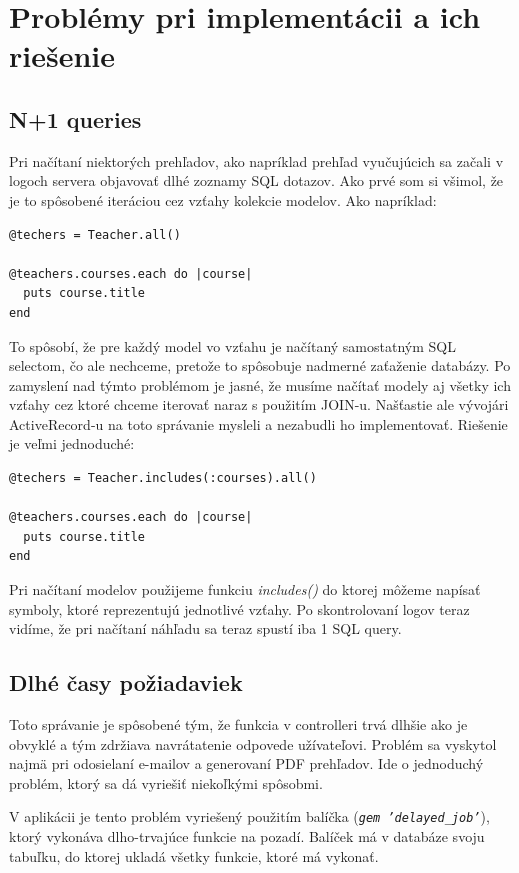 \section{Problémy pri implementácii a ich riešenie}
\subsection{N+1 queries}

Pri načítaní niektorých prehľadov, ako napríklad prehľad vyučujúcich sa začali v logoch servera objavovať dlhé zoznamy SQL dotazov. Ako prvé som si všimol, že je to spôsobené iteráciou cez vzťahy kolekcie modelov. Ako napríklad:

\begin{verbatim}
@techers = Teacher.all()

@teachers.courses.each do |course|
  puts course.title
end
\end{verbatim}

To spôsobí, že pre každý model vo vzťahu je načítaný samostatným SQL selectom, čo ale nechceme, pretože to spôsobuje nadmerné zaťaženie databázy. Po zamyslení nad týmto problémom je jasné, že musíme načítať modely aj všetky ich vzťahy cez ktoré chceme iterovať naraz s použitím JOIN-u.
Našťastie ale vývojári ActiveRecord-u na toto správanie mysleli a nezabudli ho implementovať. Riešenie je veľmi jednoduché:

\begin{verbatim}
@techers = Teacher.includes(:courses).all()

@teachers.courses.each do |course|
  puts course.title
end
\end{verbatim}

Pri načítaní modelov použijeme funkciu \emph{includes()} do ktorej môžeme napísať symboly, ktoré reprezentujú jednotlivé vzťahy. Po skontrolovaní logov teraz vidíme, že pri načítaní náhľadu sa teraz spustí iba 1 SQL query.

\subsection{Dlhé časy požiadaviek}
\label{sec:request_time}

Toto správanie je spôsobené tým, že funkcia v controlleri trvá dlhšie ako je obvyklé a tým zdržiava navrátatenie odpovede užívateľovi.
Problém sa vyskytol najmä pri odosielaní e-mailov a generovaní PDF prehľadov. Ide o jednoduchý problém, ktorý sa dá vyriešiť niekoľkými spôsobmi. 

V aplikácii je tento problém vyriešený použitím balíčka (\emph{\texttt{gem 'delayed\_job'}}), ktorý vykonáva dlho-trvajúce funkcie na pozadí. Balíček má v databáze svoju tabuľku, do ktorej ukladá všetky funkcie, ktoré má vykonať. 

